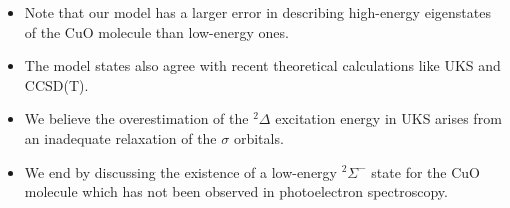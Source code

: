 \documentclass{article}
\begin{document}
\begin{enumerate}
\begin{itemize}
\item Note that our model has a larger error in describing high-energy eigenstates of the CuO molecule than low-energy ones.

\item The model states also agree with recent theoretical calculations like UKS and CCSD(T).

\item We believe the overestimation of the $^2\Delta$ excitation energy in UKS arises from an inadequate relaxation of the $\sigma$ orbitals.

\item We end by discussing the existence of a low-energy $^2\Sigma^-$ state for the CuO molecule which has not been observed in photoelectron spectroscopy.
\end{itemize}
\end{enumerate}
\end{document}
